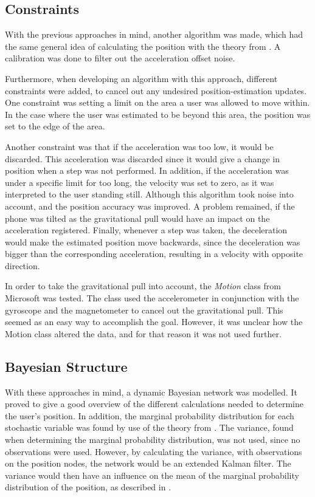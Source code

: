 \subsection*{Constraints}
With the previous approaches in mind, another algorithm was made, which had the same general idea of calculating the position with the theory from .
A calibration was done to filter out the acceleration offset noise. 

Furthermore, when developing an algorithm with this approach, different constraints were added, to cancel out any undesired position-estimation updates.
One constraint was setting a limit on the area a user was allowed to move within. 
In the case where the user was estimated to be beyond this area, the position was set to the edge of the area.
 
Another constraint was that if the acceleration was too low, it would be discarded.
This acceleration was discarded since it would give a change in position when a step was not performed. 
In addition, if the acceleration was under a specific limit for too long, the velocity was set to zero, as it was interpreted to the user standing still.
Although this algorithm took noise into account, and the position accuracy was improved.
A problem remained, if the phone was tilted as the gravitational pull would have an impact on the acceleration registered.
Finally, whenever a step was taken, the deceleration would make the estimated position move backwards, since the deceleration was bigger than the corresponding acceleration, resulting in a velocity with opposite direction.

In order to take the gravitational pull into account, the \textit{Motion} class from Microsoft \citep{misc:motionclass} was tested.
The class used the accelerometer in conjunction with the gyroscope and the magnetometer to cancel out the gravitational pull.
This seemed as an easy way to accomplish the goal.
However, it was unclear how the Motion class altered the data, and for that reason it was not used further.

\subsection*{Bayesian Structure}
With these approaches in mind, a dynamic Bayesian network was modelled.
It proved to give a good overview of the different calculations needed to determine the user's position.
In addition, the marginal probability distribution for each stochastic variable was found by use of the theory from .
The variance, found when determining the marginal probability distribution, was not used, since no observations were used. 
However, by calculating the variance, with observations on the position nodes, the network would be an extended Kalman filter.
The variance would then have an influence on the mean of the marginal probability distribution of the position, as described in .

